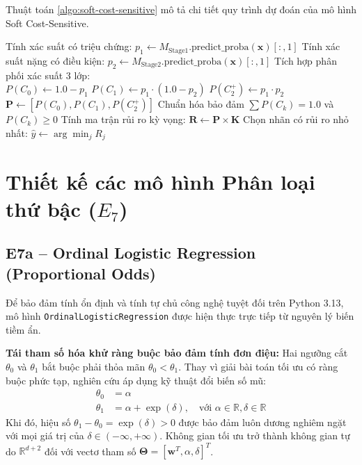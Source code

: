 Thuật toán \ref{algo:soft-cost-sensitive} mô tả chi tiết quy trình dự đoán của mô hình Soft Cost-Sensitive.

\begin{algorithm}[h!]
\SetAlgoLined
{}
Tính xác suất có triệu chứng: $p_1 \leftarrow M_{\text{Stage1}}.\text{predict\_proba}(\mathbf{x})[:, 1]$\;
Tính xác suất nặng có điều kiện: $p_2 \leftarrow M_{\text{Stage2}}.\text{predict\_proba}(\mathbf{x})[:, 1]$\;
Tích hợp phân phối xác suất 3 lớp:\\
$P(C_0) \leftarrow 1.0 - p_1$\;
$P(C_1) \leftarrow p_1 \cdot (1.0 - p_2)$\;
$P(C_2^+) \leftarrow p_1 \cdot p_2$\;
$\mathbf{P} \leftarrow [P(C_0), P(C_1), P(C_2^+)]$\;
Chuẩn hóa bảo đảm $\sum P(C_k) = 1.0$ và $P(C_k) \ge 0$\;
Tính ma trận rủi ro kỳ vọng: $\mathbf{R} \leftarrow \mathbf{P} \times \mathbf{K}$\;
Chọn nhãn có rủi ro nhỏ nhất: $\hat{y} \leftarrow \arg\min_j R_j$\;
\;
\caption{Quy trình suy diễn xác suất mềm và quyết định nhạy chi phí ($E_6$)}
\label{algo:soft-cost-sensitive}
\end{algorithm}

\section{Thiết kế các mô hình Phân loại thứ bậc ($E_7$)}
\label{sec:thiet-ke-ordinal}

\subsection{E7a – Ordinal Logistic Regression (Proportional Odds)}
Để bảo đảm tính ổn định và tính tự chủ công nghệ tuyệt đối trên Python 3.13, mô hình \texttt{OrdinalLogisticRegression} được hiện thực trực tiếp từ nguyên lý biến tiềm ẩn. 

\textbf{Tái tham số hóa khử ràng buộc bảo đảm tính đơn điệu:}
Hai ngưỡng cắt $\theta_0$ và $\theta_1$ bắt buộc phải thỏa mãn $\theta_0 < \theta_1$. Thay vì giải bài toán tối ưu có ràng buộc phức tạp, nghiên cứu áp dụng kỹ thuật đổi biến số mũ:
\begin{align}
    \theta_0 &= \alpha \\
    \theta_1 &= \alpha + \exp(\delta), \quad \text{với } \alpha \in \mathbb{R}, \delta \in \mathbb{R}
\end{align}
Khi đó, hiệu số $\theta_1 - \theta_0 = \exp(\delta) > 0$ được bảo đảm luôn dương nghiêm ngặt với mọi giá trị của $\delta \in (-\infty, +\infty)$. Không gian tối ưu trở thành không gian tự do $\mathbb{R}^{d+2}$ đối với vectơ tham số $\mathbf{\Theta} = [\mathbf{w}^T, \alpha, \delta]^T$.

